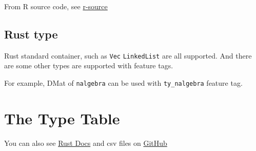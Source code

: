 \documentclass[]{book}
\begin{document}
From R source code, see
\href{https://github.com/wch/r-source/blob/10617567bb97827f4b68b375e67f409f6013d93b/src/include/Rinternals.h\#L148-L178}{r-source}

\subsection{Rust type}\label{rust-type}

Rust standard container, such as \texttt{Vec} \texttt{LinkedList} are
all supported. And there are some other types are supported with feature
tags.

For example, DMat of \texttt{nalgebra} can be used with
\texttt{ty\_nalgebra} feature tag.

\section{The Type Table}\label{the-type-table}

You can also see
\href{http://docs.rustr.org/rustr/traits/trait.RNew.html}{Rust Docs} and
csv files on
\href{https://github.com/rustr/book/blob/master/type_table.csv}{GitHub}
\end{document}
